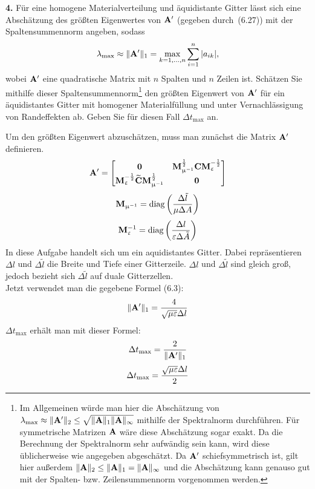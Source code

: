 \documentclass[Protokollheft.tex]{subfiles}
\begin{document}
\begin{framed}
	\noindent \textbf{4.} Für eine homogene Materialverteilung und äquidistante Gitter
    lässt sich eine Abschätzung des größten Eigenwertes von $ \mathbf{A} '$ (gegeben durch~(6.27)) mit der Spaltensummennorm angeben, sodass~
    \begin{align}
        \lambda_{\text{max}} \approx\| \mathbf{A} '\|_1=\max_{k=1,\ldots,n} \sum_{i=1}^n |a_{ik}|,
    \end{align}
    wobei $ \mathbf{A} '$ eine quadratische Matrix mit $n$ Spalten und $n$ Zeilen
    ist. Schätzen Sie mithilfe dieser Spaltensummennorm\footnote{Im Allgemeinen würde man hier die Abschätzung von $\lambda_{\text{max}}\approx\| \mathbf{A} '\|_2\le\sqrt{\| \mathbf{A} \|_1\| \mathbf{A} \|_\infty}$ mithilfe der Spektralnorm durchführen. Für symmetrische Matrizen $ \mathbf{A} $ wäre diese Abschätzung sogar exakt. Da die Berechnung der Spektralnorm sehr aufwändig sein kann, wird diese üblicherweise wie angegeben abgeschätzt. Da $ \mathbf{A} '$ schiefsymmetrisch ist, gilt hier außerdem ${\| \mathbf{A} \|_2\le\| \mathbf{A} \|_1=\| \mathbf{A} \|_\infty}$ und die Abschätzung kann genauso gut mit der Spalten- bzw. Zeilensummennorm vorgenommen werden.}
    den größten Eigenwert von $ \mathbf{A} '$ für ein äquidistantes Gitter mit
    homogener Materialfüllung und unter Vernachlässigung von Randeffekten ab. Geben Sie für diesen Fall $\Delta t_{\text{max}}$ an.\label{exer:approxEVofAprime}
\end{framed}

Um den größten Eigenwert abzuschätzen, muss man zunächst die Matrix $ \mathbf{A} '$ definieren.
$$ \mathbf{A} '=\begin{bmatrix}
\boldsymbol{0} & \mathbf{M}_{\upmu^{-1}}^{\frac12}\mathbf{C}\mathbf{M}_{\upvarepsilon}^{-\frac12}\\
\mathbf{M}_{\upvarepsilon}^{-\frac12}\widetilde{\mathbf{C}} \mathbf{M}_{\upmu^{-1}}^{\frac12} & \boldsymbol{0}
\end{bmatrix} $$
$$\mathbf{M}_{\upmu^{-1}} = \text{diag}\left(\frac{\Delta\tilde{l}}{\mu\Delta A}\right) $$
$$\mathbf{M}_{\upvarepsilon}^{-1} = \text{diag}\left(\frac{\Delta l}{\varepsilon\Delta \tilde{A}}\right) $$
\noindent
In diese Aufgabe handelt sich um ein aquidistantes Gitter. Dabei repräsentieren $\Delta l$ und  $\Delta \tilde{l}$ die Breite und Tiefe einer Gitterzeile. $\Delta l$ und  $\Delta \tilde{l}$ sind gleich groß, jedoch bezieht sich $\Delta \tilde{l}$ auf duale Gitterzellen.\\
Jetzt verwendet man die gegebene Formel (6.3):
$$\| \mathbf{A} '\|_1 = \frac{4}{\sqrt{\mu\varepsilon}\Delta l}$$
$\Delta t_{\text{max}}$ erhält man mit dieser Formel:
$$ \Delta t_{\text{max}}=\frac{2}{\| \mathbf{A} '\|_1}$$
$$ \Delta t_{\text{max}}=\frac{\sqrt{\mu\varepsilon}\Delta l}{2}$$
\end{document}
